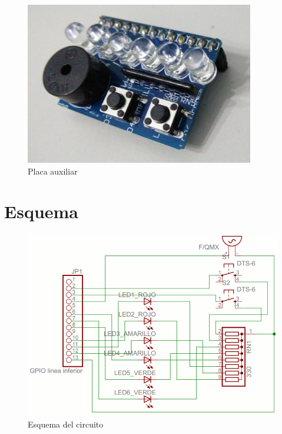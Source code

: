 \pagestyle{fancy}
\fancyhead[LE,RO]{\thepage}
\fancyhead[LO]{\nouppercase{\rightmark}}

\label{chp:PlacaAux}
\minitoc

\begin{figure}[h!]
  \centering
    \includegraphics[width=10cm]{graphs/fotoplacaaux.jpg}
  \caption{Placa auxiliar}
  \label{fig:placaaux}
\end{figure}

\section{Esquema}

\begin{figure}[h]
  \centering
    \includegraphics[width=14cm]{graphs/circuito.png}
  \caption{Esquema del circuito}
  \label{fig:circuito}
\end{figure}

